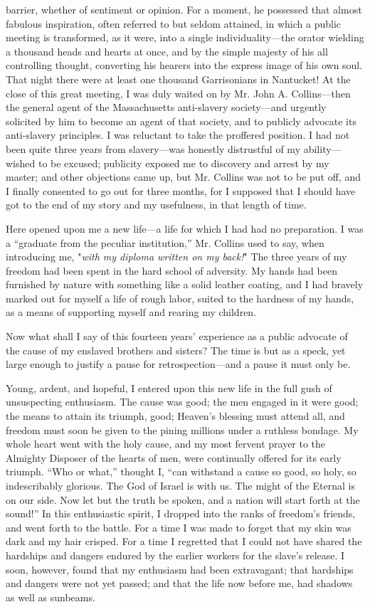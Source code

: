 barrier, whether of sentiment or opinion. For a moment, he possessed
that almost fabulous inspiration, often referred to but seldom attained,
in which a public meeting is transformed, as it were, into a single
individuality---the orator wielding a thousand heads and hearts at once,
and by the simple majesty of his all controlling thought, converting his
hearers into the express image of his own soul. That night there were at
least one thousand Garrisonians in Nantucket! At the close of this great
meeting, I was duly waited on by {}Mr. John A. Collins---then the
general agent of the Massachusetts anti-slavery society---and urgently
solicited by him to become an agent of that society, and to publicly
advocate its anti-slavery principles. I was reluctant to take the
proffered position. I had not been quite three years from slavery---was
honestly distrustful of my ability---wished to be excused; publicity
exposed me to discovery and arrest by my master; and other objections
came up, but Mr. Collins was not to be put off, and I finally consented
to go out for three months, for I supposed that I should have got to the
end of my story and my usefulness, in that length of time.

Here opened upon me a new life---a life for which I had had no
preparation. I was a ``graduate from the peculiar institution,'' Mr.
Collins used to say, when introducing me, "\emph{with my diploma written
on my back!}" The three years of my freedom had been spent in the hard
school of adversity. My hands had been furnished by nature with
something like a solid leather coating, and I had bravely marked out for
myself a life of rough labor, suited to the hardness of my hands, as a
means of supporting myself and rearing my children.

Now what shall I say of this fourteen years' experience as a public
advocate of the cause of my enslaved brothers and sisters? The time is
but as a speck, yet large enough to justify a pause for
retrospection---and a pause it must only be.

Young, ardent, and hopeful, I entered upon this new life in the full
gush of unsuspecting enthusiasm. The cause was good; the men engaged in
it were {}good; the means to attain its triumph, good; Heaven's blessing
must attend all, and freedom must soon be given to the pining millions
under a ruthless bondage. My whole heart went with the holy cause, and
my most fervent prayer to the Almighty Disposer of the hearts of men,
were continually offered for its early triumph. ``Who or what,'' thought
I, ``can withstand a cause so good, so holy, so indescribably glorious.
The God of Israel is with us. The might of the Eternal is on our side.
Now let but the truth be spoken, and a nation will start forth at the
sound!'' In this enthusiastic spirit, I dropped into the ranks of
freedom's friends, and went forth to the battle. For a time I was made
to forget that my skin was dark and my hair crisped. For a time I
regretted that I could not have shared the hardships and dangers endured
by the earlier workers for the slave's release. I soon, however, found
that my enthusiasm had been extravagant; that hardships and dangers were
not yet passed; and that the life now before me, had shadows as well as
sunbeams.

